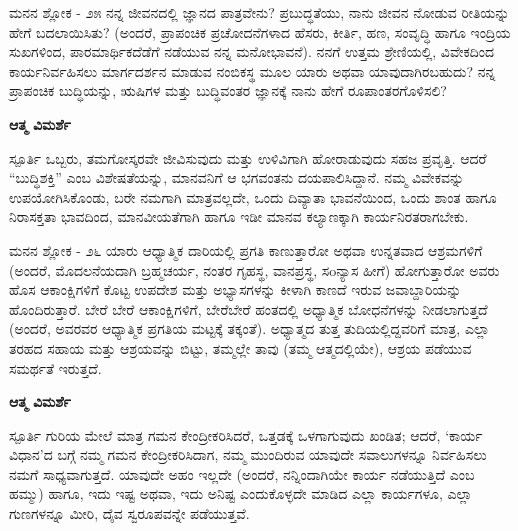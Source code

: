 \newpage
\begin{mananam}{\mananamfont \large ಮನನ ಶ್ಲೋಕ - ೨೫}
\mananamtext ನನ್ನ ಜೀವನದಲ್ಲಿ ಜ್ಞಾನದ ಪಾತ್ರವೇನು? ಪ್ರಬುದ್ಧತೆಯು, ನಾನು ಜೀವನ ನೋಡುವ ರೀತಿಯನ್ನು ಹೇಗೆ ಬದಲಾಯಿಸಿತು? (ಅಂದರೆ, ಪ್ರಾಪಂಚಿಕ ಪ್ರಚೋದನೆಗಳಾದ ಹೆಸರು, ಕೀರ್ತಿ, ಹಣ, ಸಂವೃದ್ಧಿ ಹಾಗೂ ಇಂದ್ರಿಯ ಸುಖಗಳಿಂದ, ಪಾರಮಾರ್ಥಿಕದೆಡೆಗೆ ನಡೆಯುವ ನನ್ನ ಮನೋಭಾವನೆ). ನನಗೆ ಉತ್ತಮ ಶ್ರೇಣಿಯಲ್ಲಿ, ವಿವೇಕದಿಂದ ಕಾರ್ಯನಿರ್ವಹಿಸಲು ಮಾರ್ಗದರ್ಶನ ಮಾಡುವ ನಂಬಿಕಸ್ಥ ಮೂಲ ಯಾರು ಅಥವಾ ಯಾವುದಾಗಿರಬಹುದು? ನನ್ನ ಪ್ರಾಪಂಚಿಕ ಬುದ್ಧಿಯನ್ನು, ಋಷಿಗಳ ಮತ್ತು ಬುದ್ಧಿವಂತರ ಜ್ಞಾನಕ್ಕೆ ನಾನು ಹೇಗೆ ರೂಪಾಂತರಗೊಳಿಸಲಿ? 
\end{mananam}
\WritingHand\enspace\textbf{ಆತ್ಮ ವಿಮರ್ಶೆ}\\
\begin{inspiration}{\mananamfont \large ಸ್ಪೂರ್ತಿ}
\mananamtext ಒಬ್ಬರು, ತಮಗೋಸ್ಕರವೇ ಜೀವಿಸುವುದು ಮತ್ತು ಉಳಿವಿಗಾಗಿ ಹೋರಾಡುವುದು ಸಹಜ ಪ್ರವೃತ್ತಿ. ಆದರೆ “ಬುದ್ಧಿಶಕ್ತಿ” ಎಂಬ ವಿಶೇಷತೆಯನ್ನು, ಮಾನವನಿಗೆ ಆ ಭಗವಂತನು ದಯಪಾಲಿಸಿದ್ದಾನೆ. ನಮ್ಮ ವಿವೇಕವನ್ನು ಉಪಯೋಗಿಸಿಕೊಂಡು, ಬರೇ ನಮಗಾಗಿ ಮಾತ್ರವಲ್ಲದೇ, ಒಂದು ದಿವ್ಯಾತಾ ಭಾವನೆಯಿಂದ, ಒಂದು ಶಾಂತ ಹಾಗೂ ನಿರಾಸಕ್ತತಾ ಭಾವದಿಂದ, ಮಾನವೀಯತೆಗಾಗಿ ಹಾಗೂ ಇಡೀ ಮಾನವ ಕಲ್ಯಾಣಕ್ಕಾಗಿ ಕಾರ್ಯನಿರತರಾಗಬೇಕು. 
\end{inspiration}
\newpage

\begin{mananam}{\mananamfont \large ಮನನ ಶ್ಲೋಕ - ೨೬}
\mananamtext ಯಾರು ಆಧ್ಯಾತ್ಮಿಕ ದಾರಿಯಲ್ಲಿ ಪ್ರಗತಿ ಕಾಣುತ್ತಾರೋ ಅಥವಾ ಉನ್ನತವಾದ ಆಶ್ರಮಗಳಿಗೆ (ಅಂದರೆ, ಮೊದಲನೆಯದಾಗಿ ಬ್ರಹ್ಮಚರ್ಯ, ನಂತರ ಗೃಹಸ್ಥ, ವಾನಪ್ರಸ್ಥ, ಸoನ್ಯಾಸ ಹೀಗೆ) ಹೋಗುತ್ತಾರೋ ಅವರು ಹೊಸ ಆಕಾಂಕ್ಷಿಗಳಿಗೆ ಕೊಟ್ಟ ಉಪದೇಶ ಮತ್ತು ಅಭ್ಯಾಸಗಳನ್ನು ಕೀಳಾಗಿ ಕಾಣದೆ ಇರುವ ಜವಾಬ್ದಾರಿಯನ್ನು ಹೊಂದಿರುತ್ತಾರೆ. ಬೇರೆ ಬೇರೆ ಆಕಾಂಕ್ಷಿಗಳಿಗೆ, ಬೇರೆಬೇರೆ ಹಂತದಲ್ಲಿ ಅಧ್ಯಾತ್ಮಿಕ ಬೋಧನೆಗಳನ್ನು ನೀಡಲಾಗುತ್ತದೆ (ಅಂದರೆ, ಅವರವರ ಆಧ್ಯಾತ್ಮಿಕ ಪ್ರಗತಿಯ ಮಟ್ಟಕ್ಕೆ ತಕ್ಕಂತೆ). ಅಧ್ಯಾತ್ಮದ ತುತ್ತ ತುದಿಯಲ್ಲಿದ್ದವರಿಗೆ ಮಾತ್ರ, ಎಲ್ಲಾ ತರಹದ ಸಹಾಯ ಮತ್ತು ಆಶ್ರಯವನ್ನು ಬಿಟ್ಟು, ತಮ್ಮಲ್ಲೇ ತಾವು (ತಮ್ಮ ಆತ್ಮದಲ್ಲಿಯೇ), ಆಶ್ರಯ ಪಡೆಯುವ ಸಮರ್ಥತೆ ಇರುತ್ತದೆ.
\end{mananam}
\WritingHand\enspace\textbf{ಆತ್ಮ ವಿಮರ್ಶೆ}\\
\begin{inspiration}{\mananamfont \large ಸ್ಪೂರ್ತಿ}
\mananamtext ಗುರಿಯ ಮೇಲೆ ಮಾತ್ರ ಗಮನ ಕೇಂದ್ರೀಕರಿಸಿದರೆ, ಒತ್ತಡಕ್ಕೆ ಒಳಗಾಗುವುದು ಖಂಡಿತ; ಆದರೆ, ‘ಕಾರ್ಯ ವಿಧಾನ’ದ ಬಗ್ಗೆ ನಮ್ಮ ಗಮನ ಕೇಂದ್ರೀಕರಿಸಿದಾಗ, ನಮ್ಮ ಮುಂದಿರುವ ಯಾವುದೇ ಸವಾಲುಗಳನ್ನೂ ನಿರ್ವಹಿಸಲು ನಮಗೆ ಸಾಧ್ಯವಾಗುತ್ತದೆ. ಯಾವುದೇ ಅಹಂ ಇಲ್ಲದೇ (ಅಂದರೆ, ನನ್ನಿಂದಾಗಿಯೇ ಕಾರ್ಯ ನಡೆಯುತ್ತಿದೆ ಎಂಬ ಹಮ್ಮು) ಹಾಗೂ, ಇದು ಇಷ್ಟ ಅಥವಾ, ಇದು ಅನಿಷ್ಟ ಎಂದುಕೊಳ್ಳದೇ ಮಾಡಿದ ಎಲ್ಲಾ ಕಾರ್ಯಗಳೂ, ಎಲ್ಲಾ ಗುಣಗಳನ್ನೂ ಮೀರಿ, ದೈವ ಸ್ವರೂಪವನ್ನೇ ಪಡೆಯುತ್ತವೆ.
\end{inspiration}
\newpage


